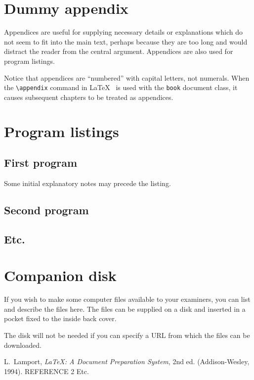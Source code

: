 \documentclass[12pt,openany,a4paper]{book}
\begin{document}

\chapter{Dummy appendix}

Appendices are useful for supplying necessary details or explanations
which do not seem to fit into the main text, perhaps because they are
too long and would distract the reader from the central argument.
Appendices are also used for program listings.

Notice that appendices are ``numbered'' with capital letters, not
numerals.  When the \verb+\appendix+ command in
\LaTeX~\cite[p.\,175]{lamport} is used with the \texttt{book} document
class, it causes subsequent chapters to be treated as appendices.

\chapter{Program listings}

\section{First program}

Some initial explanatory notes may precede the listing.

\section{Second program}

\section{Etc.}

\chapter{Companion disk}

If you wish to make some computer files available to your examiners,
you can list and describe the files here.  The files can be supplied
on a disk and inserted in a pocket fixed to the inside back cover.

The disk will not be needed if you can specify a URL from which the
files can be downloaded.

\cleardoublepage

\begin{thebibliography}{99}
 L.~Lamport, \emph{\LaTeX: A Document Preparation
System}, 2nd ed. (Addison-Wesley, 1994).
 REFERENCE 2
 Etc.
\end{thebibliography}
\end{document}
